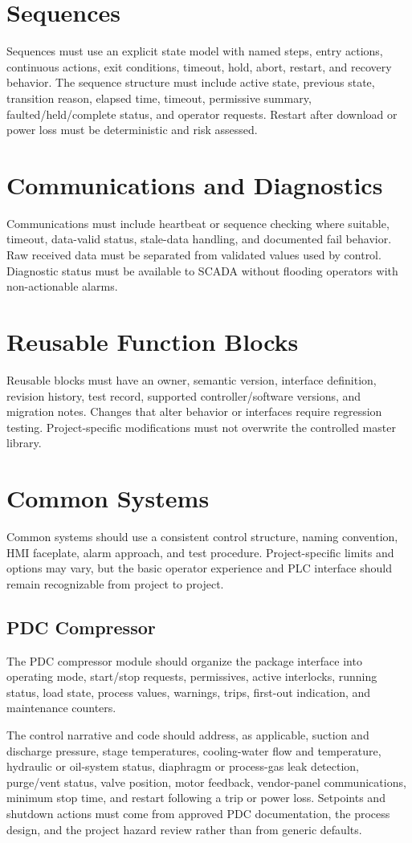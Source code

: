 \section{Sequences}
Sequences must use an explicit state model with named steps, entry actions, continuous actions, exit conditions, timeout, hold, abort, restart, and recovery behavior. The sequence structure must include active state, previous state, transition reason, elapsed time, timeout, permissive summary, faulted/held/complete status, and operator requests. Restart after download or power loss must be deterministic and risk assessed.

\section{Communications and Diagnostics}
Communications must include heartbeat or sequence checking where suitable, timeout, data-valid status, stale-data handling, and documented fail behavior. Raw received data must be separated from validated values used by control. Diagnostic status must be available to SCADA without flooding operators with non-actionable alarms.

\section{Reusable Function Blocks}
Reusable blocks must have an owner, semantic version, interface definition, revision history, test record, supported controller/software versions, and migration notes. Changes that alter behavior or interfaces require regression testing. Project-specific modifications must not overwrite the controlled master library.

\section{Common Systems}
Common systems should use a consistent control structure, naming convention, HMI faceplate, alarm approach, and test procedure. Project-specific limits and options may vary, but the basic operator experience and PLC interface should remain recognizable from project to project.

\subsection{PDC Compressor}
The PDC compressor module should organize the package interface into operating mode, start/stop requests, permissives, active interlocks, running status, load state, process values, warnings, trips, first-out indication, and maintenance counters.

The control narrative and code should address, as applicable, suction and discharge pressure, stage temperatures, cooling-water flow and temperature, hydraulic or oil-system status, diaphragm or process-gas leak detection, purge/vent status, valve position, motor feedback, vendor-panel communications, minimum stop time, and restart following a trip or power loss. Setpoints and shutdown actions must come from approved PDC documentation, the process design, and the project hazard review rather than from generic defaults.

